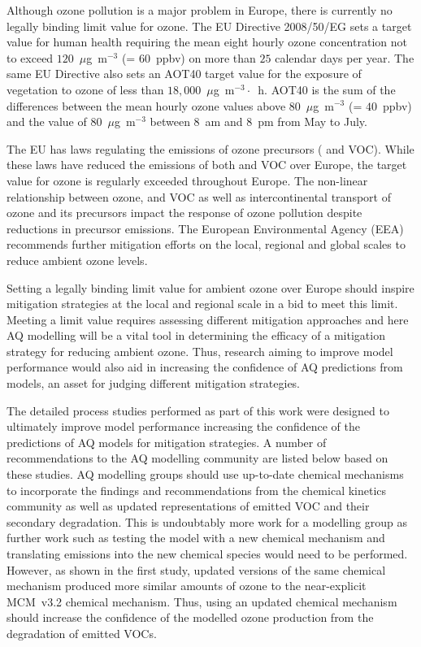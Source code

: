 Although ozone pollution is a major problem in Europe, there is currently no legally binding limit value for ozone.
The EU Directive 2008/50/EG sets a target value for human health requiring the mean eight hourly ozone concentration not to exceed $120$~$\mu$g~m$^{-3}$ (= $60$~ppbv) on more than $25$ calendar days per year.
The same EU Directive also sets an AOT40 target value for the exposure of vegetation to ozone of less than $18,000$~$\mu$g~m$^{-3}\cdot$~h. 
AOT40 is the sum of the differences between the mean hourly ozone values above $80$~$\mu$g~m$^{-3}$ (= $40$~ppbv) and the value of $80$~$\mu$g~m$^{-3}$ between 8~am and 8~pm from May to July.

The EU has laws regulating the emissions of ozone precursors ( and VOC).
While these laws have reduced the emissions of both  and VOC over Europe, the target value for ozone is regularly exceeded throughout Europe.
The non-linear relationship between ozone,  and VOC as well as intercontinental transport of ozone and its precursors impact the response of ozone pollution despite reductions in precursor emissions.
The European Environmental Agency (EEA) recommends further mitigation efforts on the local, regional and global scales to reduce ambient ozone levels.

Setting a legally binding limit value for ambient ozone over Europe should inspire mitigation strategies at the local and regional scale in a bid to meet this limit.
Meeting a limit value requires assessing different mitigation approaches and here AQ modelling will be a vital tool in determining the efficacy of a mitigation strategy for reducing ambient ozone. 
Thus, research aiming to improve model performance would also aid in increasing the confidence of AQ predictions from models, an asset for judging different mitigation strategies.

\newpage
The detailed process studies performed as part of this work were designed to ultimately improve model performance increasing the confidence of the predictions of AQ models for mitigation strategies.
A number of recommendations to the AQ modelling community are listed below based on these studies.
AQ modelling groups should use up-to-date chemical mechanisms to incorporate the findings and recommendations from the chemical kinetics community as well as updated representations of emitted VOC and their secondary degradation.
This is undoubtably more work for a modelling group as further work such as testing the model with a new chemical mechanism and translating emissions into the new chemical species would need to be performed.
However, as shown in the first study, updated versions of the same chemical mechanism produced more similar amounts of ozone to the near-explicit MCM~v3.2 chemical mechanism.
Thus, using an updated chemical mechanism should increase the confidence of the modelled ozone production from the degradation of emitted VOCs.


